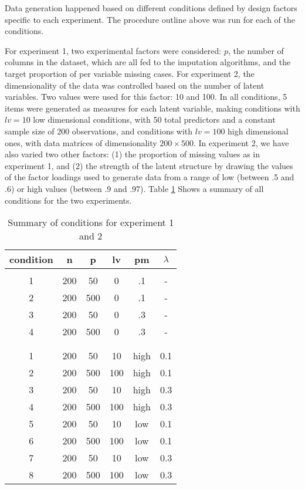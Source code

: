 	Data generation happened based on different conditions defined by design factors specific to each experiment.
	The procedure outline above was run for each of the conditions.

	For experiment 1, two experimental factors were considered: $p$, the number of columns in the dataset, which 
	are all fed to the imputation algorithms, and the target proportion of per variable missing cases. 
	For experiment 2, the dimensionality of the data was controlled based on the number of latent variables. 
	Two values were used for this factor: 10 and 100. 
	In all conditions, 5 items were generated as measures for each latent variable, making conditions with $lv = 10$ 
	low dimensional conditions, with 50 total predictors and a constant sample size of 200 observations, and 
	conditions with $lv = 100$ high dimensional ones, with data matrices of dimensionality $200 \times 500$.
	In experiment 2, we have also varied two other factors: (1) the proportion of missing values as in experiment 1, 
	and (2) the strength of the latent structure by drawing the values of the factor loadings used to generate data
	from a range of low (between .5 and .6) or high values (between .9 and .97). Table \ref{table:kysymys} Shows a summary 
	of all conditions for the two experiments.

\begin{table}
   \begin{center}
        \begin{tabular}{ c c c c c c }
		\textbf{condition} & \textbf{n} & \textbf{p} & \textbf{lv} & \textbf{pm} & \textbf{$\lambda$} \\ 
		\hline

		\rowcolor{Gray}
 		\multicolumn{6}{c}{Experiment 1} \\
		\hline

		1 & 200 & 50 & 0 & .1 & - \\
		2 & 200 & 500 & 0 & .1 & - \\
		3 & 200 & 50 & 0 & .3 & - \\
		4 & 200 & 500 & 0 & .3 & - \\
	\hline
		& & & & & \\ 

		\rowcolor{Gray}
 		\multicolumn{6}{c}{Experiment 2} \\
		\hline

		1 & 200 & 50 &  10 & high & 0.1 \\
		2 & 200 & 500 & 100 & high & 0.1 \\
		3 & 200 & 50 &  10 & high & 0.3 \\
		4 & 200 & 500 & 100 & high & 0.3 \\
		5 & 200 & 50 &  10 &  low & 0.1 \\
		6 & 200 & 500 & 100 &  low & 0.1 \\
		7 & 200 & 50 &  10 &  low & 0.3 \\
		8 & 200 & 500 & 100 &  low & 0.3 \\
	\hline
        \end{tabular}
    \end{center}
\caption{Summary of conditions for experiment 1 and 2}
\label{table:kysymys}
\end{table}

